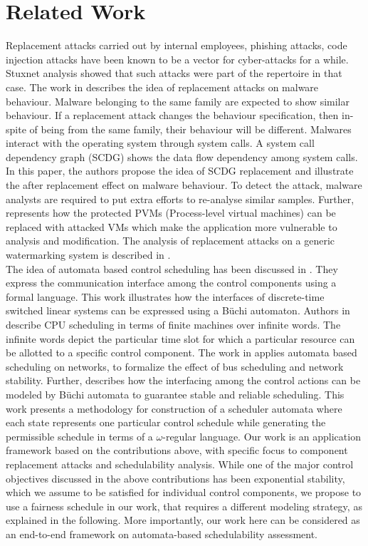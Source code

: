 \section{Related Work} \label{sec2}
Replacement attacks \cite{GhoshHD12} carried out by internal employees, phishing attacks, code injection attacks have been known to be a vector for cyber-attacks for a while. Stuxnet analysis showed that such
attacks were part of the repertoire in that case.  The work in \cite{DBLP:conf/acns/MingXLW0M15} %
describes the idea of replacement attacks on malware behaviour. Malware belonging to the
same family are expected to show similar behaviour. If a replacement attack changes the behaviour specification, then in-spite of being from the same family, their behaviour will be different. Malwares interact with the operating system through system calls. A system call dependency graph (SCDG) shows the data flow dependency among system calls. In this paper, the authors propose the idea of SCDG replacement and illustrate the after replacement effect on malware behaviour. To detect the attack, malware analysts are required to put extra efforts to re-analyse similar samples. Further,  \cite{DBLP:conf/vee/GhoshHD12} represents how the protected PVMs (Process-level virtual machines) can be replaced with attacked VMs which make the application more vulnerable to analysis and modification. The analysis of  replacement attacks on a generic watermarking system is described in \cite{DBLP:conf/ccs/KirovskiP02}. \\

\noindent
The idea of automata based control scheduling has been discussed in \cite{WeissA07}. They express
the communication interface among the control components using a formal language. This work illustrates how the interfaces of discrete-time switched linear systems
can be expressed using a B\"{u}chi automaton. Authors in \cite{AlurW08}  describe CPU scheduling
in terms of finite machines over infinite words. The infinite words depict the particular time 
slot for which a particular resource can be allotted to a specific control component. The work in \cite{WeissFAA09} applies automata based scheduling on networks, to formalize the effect of bus scheduling and network stability. Further, \cite{GhoshMDHD16} describes how the interfacing among 
the control actions can be modeled by B\"{u}chi automata to guarantee stable and reliable
scheduling. This work presents a methodology for construction of a scheduler automata 
where each state represents one particular control schedule while generating the permissible 
schedule in terms of a $\omega$-regular language. Our work is an application framework based on the contributions above, with specific focus to component replacement attacks and schedulability analysis. While one of the major control objectives discussed in the above contributions has been exponential stability, which we assume to be satisfied for individual control components, we propose to use a fairness schedule in our work, that requires a different modeling strategy, as explained in the following. More importantly, our work here can be considered as an end-to-end framework on automata-based schedulability assessment. \\
  
 
  
